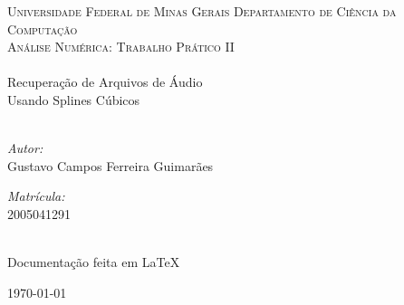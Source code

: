 \begin{titlepage}
\begin{center}

\textsc{Universidade Federal de Minas Gerais}
\textsc{Departamento de Ciência da Computação}\\[1.5cm]
\textsc{\Large Análise Numérica: Trabalho Prático II}\\[3.0cm]


\HRule \\[1.5cm]
{\huge Recuperação de Arquivos de Áudio \\ Usando Splines Cúbicos}\\[1.5cm]
\HRule \\[3.0cm]

\begin{minipage}{0.4\textwidth}
\begin{flushleft} \large
\emph{Autor:}\\
Gustavo Campos Ferreira Guimarães
\end{flushleft}
\end{minipage}
\begin{minipage}{0.4\textwidth}
\begin{flushright} \large
\emph{Matrícula:} \\
2005041291
\end{flushright}
\end{minipage}\\[1.5cm]
Documentação feita em \LaTeX

\vfill

{\large \today}

\end{center}

\end{titlepage}